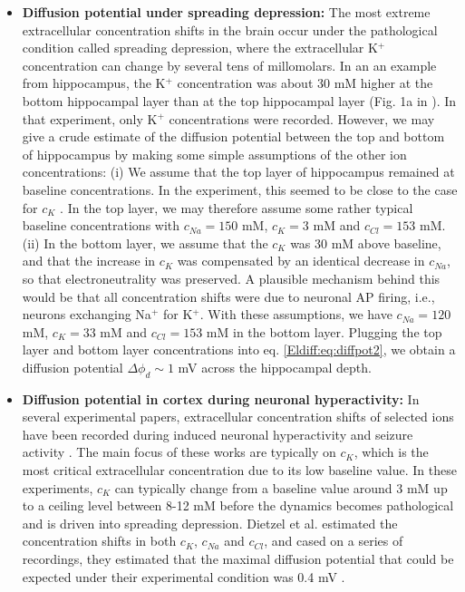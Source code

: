 \begin{itemize}

\item {\bf Diffusion potential under spreading depression:} The most extreme extracellular concentration shifts in the brain occur under the pathological condition called spreading depression, where the extracellular K$^+$ concentration can change by several tens of millomolars. In an an example from hippocampus, the K$^+$ concentration was about 30 mM higher at the bottom hippocampal layer than at the top hippocampal layer (Fig. 1a in \citep{Herreras1993}). In that experiment, only K$^+$ concentrations were recorded. However, we may give a crude estimate of the diffusion potential between the top and bottom of hippocampus by making some simple assumptions of the other ion concentrations: (i) We assume that the top layer of hippocampus remained at baseline concentrations. In the experiment, this seemed to be close to the case for $c_K$ \citep{Herreras1993}. In the top layer, we may therefore assume some rather typical baseline concentrations with $c_{Na} = 150$ mM, $c_{K} = 3$ mM and $c_{Cl} = 153$ mM. (ii) In the bottom layer, we assume that the $c_K$ was 30 mM above baseline, and that the increase in $c_K$ was compensated by an identical decrease in $c_{Na}$, so that electroneutrality was preserved. A plausible mechanism behind this would be that all concentration shifts were due to neuronal AP firing, i.e., neurons exchanging Na$^+$ for K$^+$. With these assumptions, we have $c_{Na} = 120$ mM, $c_{K} = 33$ mM and $c_{Cl} = 153$ mM in the bottom layer. Plugging the top layer and bottom layer concentrations into eq. \ref{Eldiff:eq:diffpot2}, we obtain a diffusion potential $\Delta \phi_d \sim 1$ mV across the hippocampal depth.

\item {\bf Diffusion potential in cortex during neuronal hyperactivity:} In several experimental papers, extracellular concentration shifts of selected ions have been recorded during induced neuronal hyperactivity and seizure activity \citep{kriv1975, nicholson1978, Dietzel1982, somjen1986, Dietzel1989}. The main focus of these works are typically on $c_K$, which is the most critical extracellular concentration due to its low baseline value. In these experiments, $c_K$ can typically change from a baseline value around 3 mM up to a ceiling level between 8-12 mM before the dynamics becomes pathological and is driven into spreading depression. Dietzel et al. estimated the concentration shifts in both $c_{K}$, $c_{Na}$ and $c_{Cl}$, and cased on a series of recordings, they estimated that the maximal diffusion potential that could be expected under their experimental condition was 0.4 mV \citep{Dietzel1989}.


\end{itemize}
